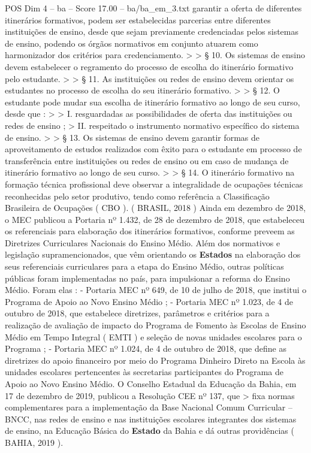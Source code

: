 \begin{textsample}{POS Dim 4 – ba – Score 17.00 – ba/ba\_em\_3.txt}
garantir a oferta de diferentes itinerários formativos, podem ser estabelecidas parcerias entre diferentes instituições de ensino, desde que sejam previamente credenciadas pelos sistemas de ensino, podendo os órgãos normativos em conjunto atuarem como harmonizador dos critérios para credenciamento. > > § 10.
Os sistemas de ensino devem estabelecer o regramento do processo de escolha do itinerário formativo pelo estudante. > > § 11.
As instituições ou redes de ensino devem orientar os estudantes no processo de escolha do seu itinerário formativo. > > § 12.
O estudante pode mudar sua escolha de itinerário formativo ao longo de seu curso, desde que : > > I. resguardadas as possibilidades de oferta das instituições ou redes de ensino ; > II. respeitado o instrumento normativo específico do sistema de ensino. > > § 13.
Os sistemas de ensino devem garantir formas de aproveitamento de estudos realizados com êxito para o estudante em processo de transferência entre instituições ou redes de ensino ou em caso de mudança de itinerário formativo ao longo de seu curso. > > § 14.
O itinerário formativo na formação técnica profissional deve observar a integralidade de ocupações técnicas reconhecidas pelo setor produtivo, tendo como referência a Classificação Brasileira de Ocupações ( CBO ). ( BRASIL, 2018 ) Ainda em dezembro de 2018, o MEC publicou a Portaria nº 1.432, de 28 de dezembro de 2018, que estabeleceu os referenciais para elaboração dos itinerários formativos, conforme preveem as Diretrizes Curriculares Nacionais do Ensino Médio.
Além dos normativos e legislação supramencionados, que vêm orientando os \textbf{Estados} na elaboração dos seus referenciais curriculares para a etapa do Ensino Médio, outras políticas públicas foram implementadas no país, para impulsionar a reforma do Ensino Médio.
Foram elas : - Portaria MEC nº 649, de 10 de julho de 2018, que institui o Programa de Apoio ao Novo Ensino Médio ; - Portaria MEC nº 1.023, de 4 de outubro de 2018, que estabelece diretrizes, parâmetros e critérios para a realização de avaliação de impacto do Programa de Fomento às Escolas de Ensino Médio em Tempo Integral ( EMTI ) e seleção de novas unidades escolares para o Programa ; - Portaria MEC nº 1.024, de 4 de outubro de 2018, que define as diretrizes do apoio financeiro por meio do Programa Dinheiro Direto na Escola às unidades escolares pertencentes às secretarias participantes do Programa de Apoio ao Novo Ensino Médio.
O Conselho Estadual da Educação da Bahia, em 17 de dezembro de 2019, publicou a Resolução CEE nº 137, que > fixa normas complementares para a implementação da Base Nacional Comum Curricular – BNCC, nas redes de ensino e nas instituições escolares integrantes dos sistemas de ensino, na Educação Básica do \textbf{Estado} da Bahia e dá outras providências ( BAHIA, 2019 ).

\end{textsample}
